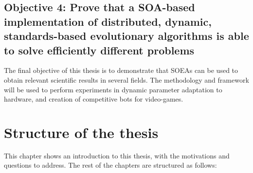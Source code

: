 \newcommand{\objectiveresearch}{Prove that a SOA-based implementation of distributed, dynamic, standards-based evolutionary algorithms is able to solve efficiently different problems} %
\subsection*{Objective 4: \objectiveresearch}
\label{subsec:intro:obj:applications}
The final objective of this thesis is to demonstrate that SOEAs can be used to obtain relevant scientific results in several fields. The methodology and framework will be used to perform experiments in dynamic parameter adaptation to hardware, and creation of competitive bots for video-games. %



\section{Structure of the thesis}
\label{sec:intro:structure}

This chapter shows an introduction to this thesis, with the
motivations and questions to address. %
The rest of the chapters are structured as follows:


